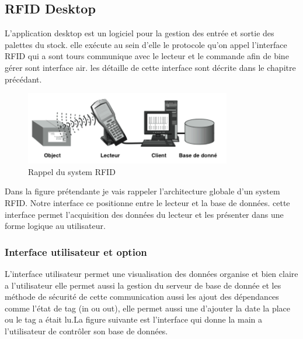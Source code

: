 \documentclass[11pt, a4paper, twoside]{book}
\begin{document}
\subsection{RFID Desktop}
L'application desktop  est un logiciel pour la gestion des entrée et sortie des palettes du stock. elle exécute au sein d'elle le protocole qu'on appel l'interface RFID qui a sont tours communique avec le lecteur et le commande  afin de bine gérer sont interface air. les détaille de cette interface sont décrite dans le chapitre précédant. 
\begin{figure}[H]
\centering
\includegraphics[width=9cm]{systemx}
\caption{Rappel du system RFID}
\end{figure}
Dans la figure prétendante je vais rappeler l'architecture globale d'un system RFID. Notre interface ce positionne entre le lecteur et la base de données. cette interface permet l'acquisition des données du lecteur et les présenter dans une forme logique au utilisateur.
\subsubsection{Interface utilisateur et option}
L'interface utilisateur permet  une visualisation des données organise et bien claire a l'utilisateur elle permet aussi  la gestion du serveur de base de donnée et les méthode de sécurité de cette communication aussi les ajout des dépendances comme l'état de tag (in ou out), elle permet aussi une d'ajouter la date la place ou le tag a était lu.La figure suivante est l'interface qui donne la main a l'utilisateur de contrôler son base de données.\\
\end{document}
